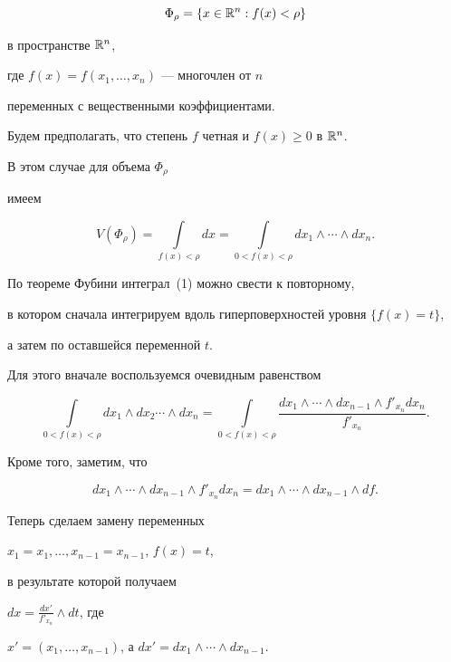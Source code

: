 $$


\Phi_\rho=\{x\in{\Bbb {R}}^n : f(x)<\rho\}


$$


в пространстве $\Bbb{R}^n$,


где $f(x)=f(x_1,\dotsc,x_n)$ --- многочлен от $n$


переменных с вещественными коэффициентами.


Будем предполагать, что степень $f$ четная и $f(x)\geqslant 0$ в $\Bbb{R}^n$.


В этом случае для объема $\Phi_\rho$


имеем


\begin{equation}


\label{o}


V(\Phi_\rho)=\int\limits_{f(x)<\rho}{dx}=\int\limits_{0<f(x)<\rho}


{dx_1\land\dotsb\land dx_n}.


\end{equation}


По теореме Фубини интеграл~(1) можно свести к повторному,


в котором сначала интегрируем вдоль гиперповерхностей уровня $\{f(x)=t\}$,


а затем по оставшейся переменной $t$.


Для этого вначале воспользуемся очевидным равенством


$$


\int\limits_{0<f(x)<\rho}{dx_1\land dx_2\dotsb\land dx_n}=


\int\limits_{0<f(x)<\rho}\frac {dx_1\land\dotsb\land dx_{n-1}\land


f'_{x_n}dx_n}{f'_{x_n}}.


$$


Кроме того, заметим, что


$$


dx_1\land\dotsb\land dx_{n-1}\land f'_{x_n}dx_n=


dx_1\land\dotsb\land dx_{n-1}\land df.


$$


Теперь сделаем замену переменных


$x_1=x_1,\dotsc,x_{n-1}=x_{n-1}$, $f(x)=t$,


в результате которой получаем


$dx={\frac {dx'}{f'_{x_n}}}\land dt$, где


$x'=(x_1,\dotsc,x_{n-1})$, а $dx'=dx_1\land\dotsb\land dx_{n-1}$.


